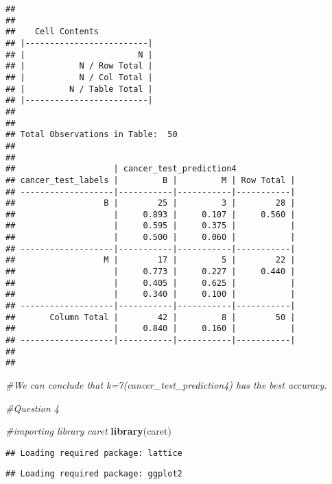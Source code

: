 \documentclass[]{article}
\newenvironment{Shaded}{\begin{snugshade}}{\end{snugshade}}
\newcommand{\KeywordTok}[1]{\textcolor[rgb]{0.13,0.29,0.53}{\textbf{#1}}}
\newcommand{\CommentTok}[1]{\textcolor[rgb]{0.56,0.35,0.01}{\textit{#1}}}
\newcommand{\NormalTok}[1]{#1}
\begin{document}
\begin{verbatim}
## 
##  
##    Cell Contents
## |-------------------------|
## |                       N |
## |           N / Row Total |
## |           N / Col Total |
## |         N / Table Total |
## |-------------------------|
## 
##  
## Total Observations in Table:  50 
## 
##  
##                    | cancer_test_prediction4 
## cancer_test_labels |         B |         M | Row Total | 
## -------------------|-----------|-----------|-----------|
##                  B |        25 |         3 |        28 | 
##                    |     0.893 |     0.107 |     0.560 | 
##                    |     0.595 |     0.375 |           | 
##                    |     0.500 |     0.060 |           | 
## -------------------|-----------|-----------|-----------|
##                  M |        17 |         5 |        22 | 
##                    |     0.773 |     0.227 |     0.440 | 
##                    |     0.405 |     0.625 |           | 
##                    |     0.340 |     0.100 |           | 
## -------------------|-----------|-----------|-----------|
##       Column Total |        42 |         8 |        50 | 
##                    |     0.840 |     0.160 |           | 
## -------------------|-----------|-----------|-----------|
## 
## 
\end{verbatim}

\begin{Shaded}
\begin{Highlighting}[]
\CommentTok{#We can conclude that k=7(cancer_test_prediction4) has the best accuracy.}
\end{Highlighting}
\end{Shaded}

\begin{Shaded}
\begin{Highlighting}[]
\CommentTok{#Question 4 }

\CommentTok{#importing library caret}
\KeywordTok{library}\NormalTok{(caret)}
\end{Highlighting}
\end{Shaded}

\begin{verbatim}
## Loading required package: lattice
\end{verbatim}

\begin{verbatim}
## Loading required package: ggplot2
\end{verbatim}
\end{document}
